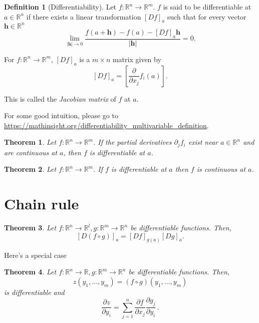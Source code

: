 \documentclass[
]{book}
\newtheorem{theorem}{Theorem}[chapter]
\theoremstyle{definition}
\newtheorem{definition}{Definition}[chapter]
\theoremstyle{definition}
\theoremstyle{definition}
\theoremstyle{definition}
\theoremstyle{remark}
\begin{document}
\begin{definition}[Differentiability]
Let \(f:\mathbb{R}^n \to \mathbb{R}^m\).
\(f\) is said to be differentiable at \(a \in \mathbb{R}^n\) if
there exists a linear transformation \([Df]_a\) such that for every vector \(\mathbf{h} \in \mathbb{R}^n\)
\[\lim_{|\mathbf{h}| \to 0} \frac{ f(a + \mathbf{h}) - f(a) - [Df]_a \mathbf{h}}{| \mathbf{h} |} = 0 . \]
\end{definition}

For \(f:\mathbb{R}^n \to \mathbb{R}^m\), \([Df]_a\) is a \(m\times n\) matrix given by
\[[Df]_a = \left[ \frac{\partial }{\partial x_j} f_i (a)\right].\]

This is called the \emph{Jacobian matrix} of \(f\) at \(a\).

For some good intuition, please go to \url{https://mathinsight.org/differentiability_multivariable_definition}.

\begin{theorem}
Let \(f:\mathbb{R}^n \to \mathbb{R}^m\).
If the partial derivatives \(\partial_j f_i\) exist near \(a\in \mathbb{R}^n\) and are continuous
at \(a\), then \(f\) is differentiable at \(a\).
\end{theorem}

\begin{theorem}
Let \(f:\mathbb{R}^n \to \mathbb{R}^m\).
If \(f\) is differentiable at \(a\) then \(f\) is continuous at \(a\).
\end{theorem}

\section{Chain rule}\label{chain-rule}

\begin{theorem}
Let \(f: \mathbb{R}^n \to \mathbb{R}^l, g: \mathbb{R}^m \to \mathbb{R}^n\) be
differentiable functions.
Then,
\[ [D (f\circ g)]_a = [Df]_{g(a)} [Dg]_a. \]
\end{theorem}

Here's a special case

\begin{theorem}
Let \(f: \mathbb{R}^n \to \mathbb{R}, g: \mathbb{R}^m \to \mathbb{R}^n\) be
differentiable functions.
Then,
\[z(y_1, \dots, y_m) = (f\circ g)(y_1, \dots, y_m)\]
is differentiable and
\begin{equation*}
    \frac{\partial z}{\partial y_i} = \sum_{j=1}^n \frac{\partial f}{\partial x_j} \frac{\partial g_j}{\partial y_i} \,.
\end{equation*}
\end{theorem}
\end{document}
